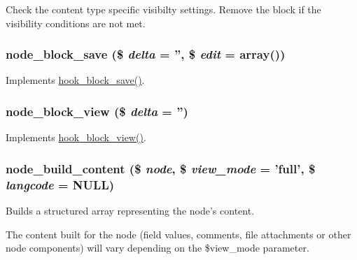 Check the content type specific visibilty settings. Remove the block if the visibility conditions are not met. \hypertarget{node_8module_a6634702b48e7d684464665c035076bcc}{
\subsubsection[{node\_\-block\_\-save}]{\setlength{\rightskip}{0pt plus 5cm}node\_\-block\_\-save (\$ {\em delta} = {\ttfamily ''}, \/  \$ {\em edit} = {\ttfamily array()})}}
\label{node_8module_a6634702b48e7d684464665c035076bcc}
Implements \hyperlink{group__hooks_ga622024ce4f818c241ca7a765e829f928}{hook\_\-block\_\-save()}. \hypertarget{node_8module_aa65ec77d9ea5b70fee4e42d36cc4e525}{
\subsubsection[{node\_\-block\_\-view}]{\setlength{\rightskip}{0pt plus 5cm}node\_\-block\_\-view (\$ {\em delta} = {\ttfamily ''})}}
\label{node_8module_aa65ec77d9ea5b70fee4e42d36cc4e525}
Implements \hyperlink{group__hooks_gaa14092a3e74cdc57aa295100cfd6860d}{hook\_\-block\_\-view()}. \hypertarget{node_8module_ab1cfacf1a2915e383e2c777d6c10b4c0}{
\subsubsection[{node\_\-build\_\-content}]{\setlength{\rightskip}{0pt plus 5cm}node\_\-build\_\-content (\$ {\em node}, \/  \$ {\em view\_\-mode} = {\ttfamily 'full'}, \/  \$ {\em langcode} = {\ttfamily NULL})}}
\label{node_8module_ab1cfacf1a2915e383e2c777d6c10b4c0}
Builds a structured array representing the node's content.

The content built for the node (field values, comments, file attachments or other node components) will vary depending on the \$view\_\-mode parameter.


